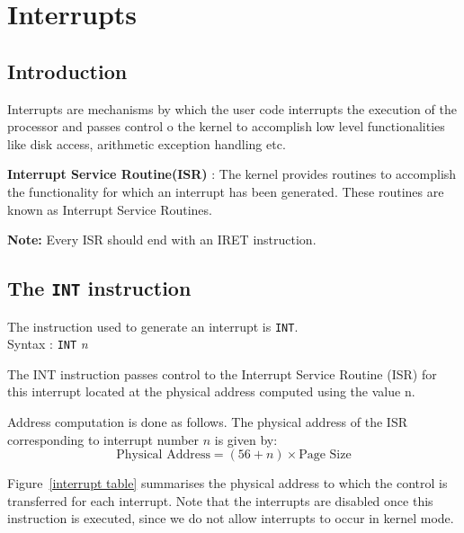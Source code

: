 \chapter{Interrupts}
\label{chp:int}
\label{lbl:int}

\section{Introduction}
Interrupts are mechanisms by which the user code interrupts the execution of the processor and passes control o the kernel to accomplish low level functionalities like disk access, arithmetic exception handling etc.

\textbf{Interrupt Service Routine(ISR)} : The kernel provides routines to accomplish the functionality for which an interrupt has been generated. These routines are known as Interrupt Service Routines. 

\textbf{Note: } Every ISR should end with an IRET instruction.

\section{The \texttt{INT} instruction}
	\label{interrupts}
	The instruction used to generate an interrupt is \texttt{INT}. \\ Syntax : \texttt{INT} \emph{n} 
	
	The INT instruction passes control to the Interrupt Service Routine (ISR) for this interrupt located at the physical address 
	computed using the value n.

	Address computation is done as follows. 
	The physical address of the ISR corresponding to interrupt number $n$ is given by:
	\begin{equation*} 
	\mbox{Physical Address} = (56+n) \times \mbox{Page Size}
	\end{equation*}
	
	Figure~\ref{interrupt table} summarises the physical address to which the control is transferred for each interrupt.
	Note that the interrupts are disabled once this instruction is executed, since we do not allow interrupts to occur in kernel mode.

